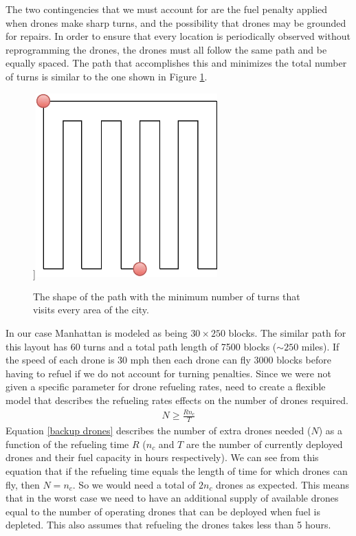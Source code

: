 \documentclass{article}
\begin{document}
\indent \indent The two contingencies that we must account for are the fuel penalty applied when drones make sharp turns, and the possibility that drones may be grounded for repairs. In order to ensure that every location is periodically observed without reprogramming the drones, the drones must all follow the same path and be equally spaced. The path that accomplishes this and minimizes the total number of turns is similar to the one shown in Figure \ref{path}.
\begin{figure}[htb!]
    \centering]{{\includegraphics[width=7cm]{figures/optimal_path.pdf} }}%
    \caption{The shape of the path with the minimum number of turns that visits every area of the city.}
    \label{path}
\end{figure}
\newline\indent In our case Manhattan is modeled as being $30\times 250$ blocks. The similar path for this layout has 60 turns and a total path length of 7500 blocks ($\sim 250$ miles). If the speed of each drone is 30 mph then each drone can fly 3000 blocks before having to refuel if we do not account for turning penalties. Since we were not given a specific parameter for drone refueling rates, need to create a flexible model that describes the refueling rates effects on the number of drones required.
\begin{eqnarray}
N \geq \frac{R n_{c}}{T}\label{backup drones}
\end{eqnarray}
Equation \ref{backup drones} describes the number of extra drones needed ($N$) as a function of the refueling time $R$ ($n_{c}$ and $T$ are the number of currently deployed drones and their fuel capacity in hours respectively). We can see from this equation that if the refueling time equals the length of time for which drones can fly, then $N = n_{c}$.  So we would need a total of $2n_{c}$ drones as expected.
This means that in the worst case we need to have an additional supply of available drones equal to the number of operating drones that can be deployed when fuel is depleted. This also assumes that refueling the drones takes less than 5 hours.
\end{document}
